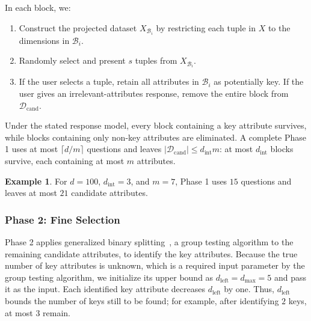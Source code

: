 \documentclass[conference]{IEEEtran}
\theoremstyle{definition}
\newtheorem{example}[theorem]{Example}
\theoremstyle{plain}
\begin{document}
In each block, we:
\begin{enumerate}
  \item Construct the projected dataset $X_{\mathcal{B}_i}$ by restricting each tuple in $X$ to the dimensions in $\mathcal{B}_i$.
  \item Randomly select and present $s$ tuples from $X_{\mathcal{B}_i}$.
  \item If the user selects a tuple, retain all attributes in $\mathcal{B}_i$ as potentially key. If the user gives an irrelevant-attributes response, remove the entire block from $\mathcal{D}_\text{cand}$.
\end{enumerate}

Under the stated response model, every block containing a key attribute survives, while blocks containing only non-key attributes are eliminated. A complete Phase 1 uses at most $\lceil d/m\rceil$ questions and leaves $\lvert\mathcal{D}_\text{cand}\rvert\leq d_\text{int}m$: at most $d_\text{int}$ blocks survive, each containing at most $m$ attributes.

\begin{example}
    For $d=100$, $d_\text{int}=3$, and $m=7$, Phase 1 uses $15$ questions and leaves at most $21$ candidate attributes.
\end{example}

\subsubsection{\textbf{Phase 2: Fine Selection}}

Phase 2 applies generalized binary splitting~\cite{WGT}, a group testing algorithm to the remaining candidate attributes, to identify the key attributes. Because the true number of key attributes is unknown, which is a required input parameter by the group testing algorithm, we initialize its upper bound as $d_\text{left}=d_\text{max}=5$ and pass it as the input. Each identified key attribute decreases $d_\text{left}$ by one. Thus, $d_\text{left}$ bounds the number of keys still to be found; for example, after identifying $2$ keys, at most $3$ remain.
\end{document}
